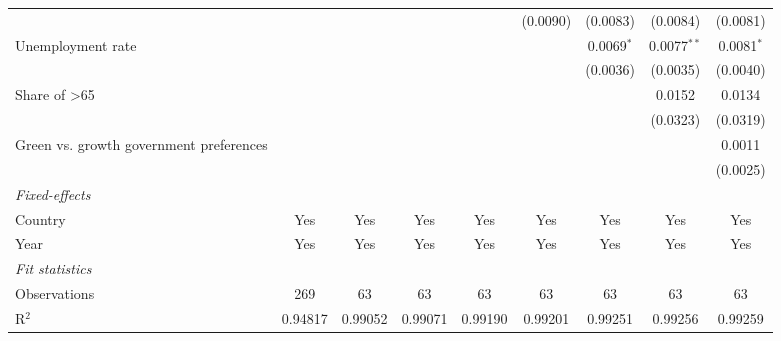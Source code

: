 \begin{table}[htbp]
\begin{tabular}{lcccccccc}
                                                                         &               &                &          &              & (0.0090)     & (0.0083)     & (0.0084)      & (0.0081)\\   
      Unemployment rate                                                  &               &                &          &              &              & 0.0069$^{*}$ & 0.0077$^{**}$ & 0.0081$^{*}$\\   
                                                                         &               &                &          &              &              & (0.0036)     & (0.0035)      & (0.0040)\\   
      Share of >65                                                       &               &                &          &              &              &              & 0.0152        & 0.0134\\   
                                                                         &               &                &          &              &              &              & (0.0323)      & (0.0319)\\   
      Green vs. growth government preferences                            &               &                &          &              &              &              &               & 0.0011\\   
                                                                         &               &                &          &              &              &              &               & (0.0025)\\   
      \midrule
      \emph{Fixed-effects}\\
      Country                                                            & Yes           & Yes            & Yes      & Yes          & Yes          & Yes          & Yes           & Yes\\  
      Year                                                               & Yes           & Yes            & Yes      & Yes          & Yes          & Yes          & Yes           & Yes\\  
      \midrule
      \emph{Fit statistics}\\
      Observations                                                       & 269           & 63             & 63       & 63           & 63           & 63           & 63            & 63\\  
      R$^2$                                                              & 0.94817       & 0.99052        & 0.99071  & 0.99190      & 0.99201      & 0.99251      & 0.99256       & 0.99259\\  

\end{tabular}
\end{table}
